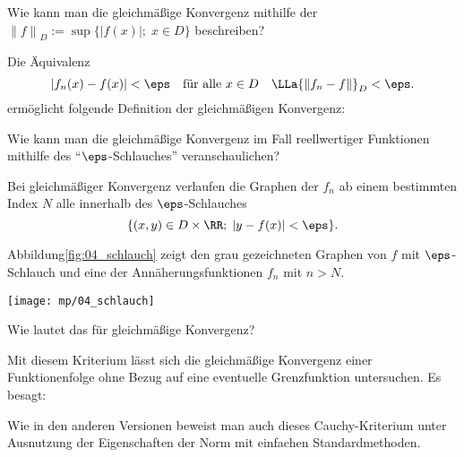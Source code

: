 \begin{frage}\label{04_gsup}
Wie kann man die gleichmäßige Konvergenz mithilfe der 
 ${\| f \|}_D := \sup \{ |f(x)|;\; x\in D\}$  
beschreiben?
\end{frage}

\begin{antwort}
Die Äquivalenz
\[
|f_n(x)-f(x)|< \eps \quad\text{für alle $x\in D$}\quad  
\LLa
{\| f_n-f \|}_D < \eps.  
\]
ermöglicht folgende Definition der gleichmäßigen Konvergenz:  \AntEnd
\end{antwort}



\begin{frage}
Wie kann man die gleichmäßige Konvergenz im Fall reellwertiger Funktionen 
mithilfe des "`$\eps$-Schlauches"' veranschaulichen?
\end{frage}

\begin{antwort}
Bei gleichmäßiger Konvergenz verlaufen die Graphen der $f_n$ ab einem 
bestimmten Index $N$ alle innerhalb des $\eps$-Schlauches 
\[
\{ (x,y)\in D\times \RR; \; |y-f(x)| < \eps \}.
\] 

\noindent
Abbildung\ref{fig:04_schlauch} zeigt den grau gezeichneten Graphen von $f$ mit  
$\eps$-Schlauch und eine der Annäherungsfunktionen $f_n$ mit $n>N$.\AntEnd

\begin{center}
  \texttt{[image: mp/04\_schlauch]}
  \label{fig:04_schlauch}
\end{center}
\end{antwort}

\begin{frage}\label{04_cau}
Wie lautet das  für gleichmäßige Konvergenz?
\end{frage}

\begin{antwort}
Mit diesem Kriterium lässt sich die gleichmäßige Konvergenz einer 
Funktionenfolge ohne Bezug auf eine eventuelle Grenzfunktion untersuchen. 
Es besagt: 

\medskip
\noindent{}
Wie in den anderen Versionen beweist man auch dieses Cauchy-Kriterium 
unter Ausnutzung der 
Eigenschaften der Norm mit einfachen Standardmethoden.  
\AntEnd
\end{antwort}


